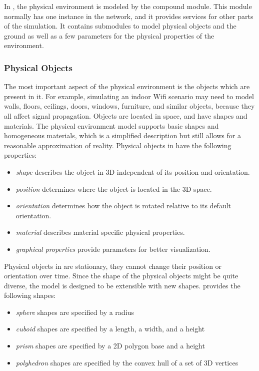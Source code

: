 In \inet, the physical environment is modeled by the  compound module. This module normally has one instance in the network, and it provides services for other parts of the simulation. It contains submodules to model physical objects and the ground as well as a few parameters for the physical properties of the environment.

\subsubsection*{Physical Objects}
The most important aspect of the physical environment is the objects which are present in it. For example, simulating an indoor Wifi scenario may need to model walls, floors, ceilings, doors, windows, furniture, and similar objects, because they all affect signal propagation. Objects are located in space, and have shapes and materials. The physical environment model supports basic shapes and homogeneous materials, which is a simplified description but still allows for a reasonable approximation of reality. Physical objects in \inet have the following properties:

\begin{itemize}
        \item \emph{shape} describes the object in 3D independent of its position and orientation.
        \item \emph{position} determines where the object is located in the 3D space.
        \item \emph{orientation} determines how the object is rotated relative to its default orientation.
        \item \emph{material} describes material specific physical properties.
        \item \emph{graphical properties} provide parameters for better visualization.
\end{itemize}

Physical objects in \inet are stationary, they cannot change their position or orientation over time. Since the shape of the physical objects might be quite diverse, the model is designed to be extensible with new shapes. \inet provides the following shapes:

\begin{itemize}
        \item \emph{sphere} shapes are specified by a radius
        \item \emph{cuboid} shapes are specified by a length, a width, and a height
        \item \emph{prism} shapes are specified by a 2D polygon base and a height
        \item \emph{polyhedron} shapes are specified by the convex hull of a set of 3D vertices
\end{itemize}

